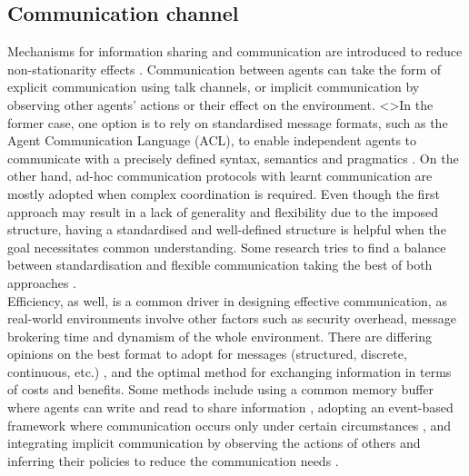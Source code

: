 \documentclass[a4paper,singleside,12pt]{report} %
\begin{document}
\subsection{Communication channel}\label{communication-channel}
Mechanisms for information sharing and communication are introduced to reduce non-stationarity effects \cite{Heider1944AnES, Rasouli2017AgreeingTC}. Communication between agents can take the form of explicit communication using talk channels, or implicit communication by observing other agents' actions or their effect on the environment. <>In the former case, one option is to rely on standardised message formats, such as the Agent Communication Language (ACL), to enable independent agents to communicate with a precisely defined syntax, semantics and pragmatics \cite{Poslad2007SpecifyingPF, Finin1994KQMLAA}. On the other hand, ad-hoc communication protocols with learnt communication are mostly adopted when complex coordination is required. Even though the first approach may result in a lack of generality and flexibility due to the imposed structure, having a standardised and well-defined structure is helpful when the goal necessitates common understanding. Some research tries to find a balance between standardisation and flexible communication taking the best of both approaches \cite{Luncean2015CommunicationAI, Koes2004CommunicationEI}.\\
Efficiency, as well, is a common driver in designing effective communication, as real-world environments involve other factors such as security overhead, message brokering time and dynamism of the whole environment. There are differing opinions on the best format to adopt for messages (structured, discrete, continuous, etc.) \cite{Lowe2017MultiAgentAF, Koes2004CommunicationEI, Li2021LearningED, Sukhbaatar2016LearningMC}, and the optimal method for exchanging information in terms of costs and benefits. Some methods include using a common memory buffer where agents can write and read to share information \cite{Pesce2019ImprovingCI}, adopting an event-based framework where communication occurs only under certain circumstances \cite{Hu2021EventTriggeredCN}, and integrating implicit communication by observing the actions of others and inferring their policies to reduce the communication needs \cite{Ding2020LearningII}.\\
\end{document}
